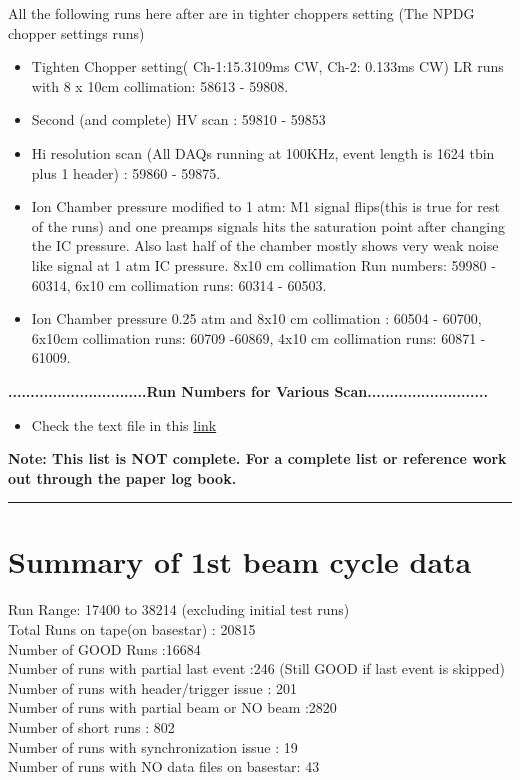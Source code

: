 \documentclass[12pt]{article}
\begin{document}
All the following runs here after are in tighter choppers setting (The  NPDG chopper settings runs)
\begin{itemize}
\item Tighten Chopper setting( Ch-1:15.3109ms CW, Ch-2: 0.133ms CW) LR runs with 8 x 10cm collimation: 58613 - 59808. \\

\item Second (and complete) HV scan : 59810 - 59853

\item Hi resolution scan (All DAQs running at 100KHz, event length is 1624 tbin plus 1 header) : 59860 - 59875.

\item Ion Chamber pressure modified to 1 atm: M1 signal flips(this is true for rest of the runs) and one preamps signals hits the saturation point after changing the IC pressure. Also last half of the chamber mostly shows very weak noise like signal at 1 atm IC pressure. 8x10 cm collimation Run numbers: 59980 - 60314, 6x10 cm collimation runs: 60314 - 60503.  
\item Ion Chamber pressure 0.25 atm and 8x10 cm collimation : 60504 - 60700, 6x10cm collimation runs: 60709 -60869, 4x10 cm collimation runs: 60871 - 61009.
\end{itemize}
\textbf{...............................Run Numbers for Various Scan...........................}
\begin{itemize}
\item Check the text file in this \href{https://raw.githubusercontent.com/latifkabir/n3He_Soft/master/Manual/tex/RunReferences.txt}{link}
\end{itemize} 
\textbf{ Note: This list is NOT complete. For a complete list or reference work out through the paper log book.} \\


\noindent
{\color{red} \rule{\linewidth}{1mm} }


\newpage
\section{Summary of 1st beam cycle data}
Run Range: 17400 to 38214 (excluding initial test runs)\\
Total Runs on tape(on basestar) : 20815 \\
Number of GOOD Runs :16684 \\
Number of runs with partial last event :246 (Still GOOD if last event is skipped)\\
Number of runs with header/trigger issue : 201 \\
Number of runs with partial beam or NO beam :2820 \\
Number of short runs : 802 \\
Number of runs with synchronization issue : 19 \\
Number of runs with NO data files on basestar: 43 \\
   
\end{document}

